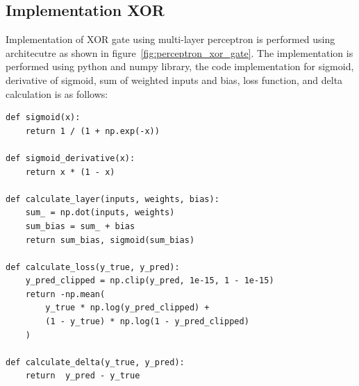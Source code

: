 \documentclass[a4paper,10pt]{article}
\begin{document}
\subsection{Implementation XOR} \label{sec:implementation_xor}

Implementation of XOR gate using multi-layer perceptron is performed using architecutre as shown in figure~\ref{fig:perceptron_xor_gate}.
The implementation is performed using python and numpy library, the code implementation for sigmoid, derivative of sigmoid, sum of weighted inputs and bias, loss function, and delta calculation is as follows:
\begin{verbatim}
def sigmoid(x):
    return 1 / (1 + np.exp(-x))

def sigmoid_derivative(x):
    return x * (1 - x)

def calculate_layer(inputs, weights, bias):
    sum_ = np.dot(inputs, weights)
    sum_bias = sum_ + bias
    return sum_bias, sigmoid(sum_bias)

def calculate_loss(y_true, y_pred):
    y_pred_clipped = np.clip(y_pred, 1e-15, 1 - 1e-15)
    return -np.mean(
        y_true * np.log(y_pred_clipped) + 
        (1 - y_true) * np.log(1 - y_pred_clipped)
    )

def calculate_delta(y_true, y_pred):
    return  y_pred - y_true

\end{verbatim}
\end{document}
